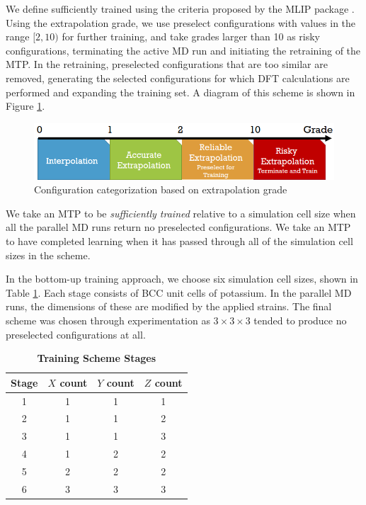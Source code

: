 \documentclass[9pt,twocolumn,twoside]{opticajnl}
\begin{document}
  We define \textit{}{sufficiently trained} using the criteria proposed by the MLIP package \cite{mlip}. Using the extrapolation grade, we use preselect configurations with values in the range $[2, 10)$ for further training, and take grades larger than 10 as risky configurations, terminating the active MD run and initiating the retraining of the MTP. In the retraining, preselected configurations that are too similar are removed, generating the selected configurations for which DFT calculations are performed and expanding the training set. A diagram of this scheme is shown in Figure \ref{fig:extrapolation}.

  \begin{figure}[ht]
    \centering
    \includegraphics[width=\linewidth]{assets/grade.png}
    \caption{Configuration categorization based on extrapolation grade}
    \label{fig:extrapolation}
  \end{figure}

  We take an MTP to be \textit{sufficiently trained} relative to a simulation cell size when all the parallel MD runs return no preselected configurations. We take an MTP to have completed learning when it has passed through all of the simulation cell sizes in the scheme.

  In the bottom-up training approach, we choose six simulation cell sizes, shown in Table \ref{tab:stages}. Each stage consists of BCC unit cells of potassium. In the parallel MD runs, the dimensions of these are modified by the applied strains. The final scheme was chosen through experimentation as $3\times 3\times 3$ tended to produce no preselected configurations at all.

\begin{table}[htbp]
  \centering
  \caption{\bf Training Scheme Stages}
  \begin{tabular}{cccc}
  \hline
  Stage & $X$ count & $Y$ count & $Z$ count\\
  \hline
  1 & 1 & 1 & 1\\
  2 & 1 & 1 & 2\\
  3 & 1 & 1 & 3\\
  4 & 1 & 2 & 2\\
  5 & 2 & 2 & 2\\
  6 & 3 & 3 & 3\\
  \hline
  \end{tabular}
  \label{tab:stages}
\end{table}
\end{document}
